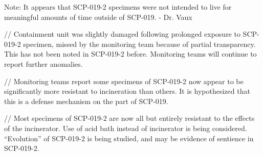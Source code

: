 Note: It appears that SCP-019-2 specimens were not intended to live for meaningful amounts of time outside of SCP-019. - Dr. Vaux

//\linebreak
Containment unit was slightly damaged following prolonged exposure to SCP-019-2 specimen, missed by the monitoring team because of partial transparency. This has not been noted in SCP-019-2 before. Monitoring teams will continue to report further anomalies.

//\linebreak
Monitoring teams report some specimens of SCP-019-2 now appear to be significantly more resistant to incineration than others. It is hypothesized that this is a defense mechanism on the part of SCP-019.

//\linebreak
Most specimens of SCP-019-2 are now all but entirely resistant to the effects of the incinerator. Use of acid bath instead of incinerator is being considered. “Evolution” of SCP-019-2 is being studied, and may be evidence of sentience in SCP-019-2.
